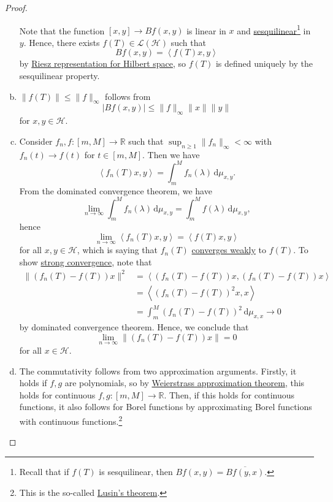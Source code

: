 \begin{proof}
\begin{enumerate}[(a)]
		      Note that the function \([x, y] \to Bf(x, y)\) is linear in \(x\) and \href{https://en.wikipedia.org/wiki/Sesquilinear_form}{sesquilinear}\footnote{Recall that if \(f(T)\) is sesquilinear, then \(Bf(x, y) = \overline{Bf(y, x)}\).} in \(y\). Hence, there exists \(f(T) \in \mathcal{L} (\mathcal{H} )\) such that
		      \[
			      Bf(x, y) = \left\langle f(T)x, y \right\rangle
		      \]
		      by \hyperref[thm:Riesz-representation]{Riesz representation for Hilbert space}, so \(f(T)\) is defined uniquely by the sesquilinear property.
		\item \(\lVert f(T) \rVert \leq \lVert f \rVert _\infty \) follows from
		      \[
			      \vert Bf(x, y) \vert  \leq \lVert f \rVert _\infty \lVert x \rVert \lVert y \rVert
		      \]
		      for \(x, y\in \mathcal{H} \).
		\item Consider \(f_n, f\colon [m, M] \to \mathbb{R} \) such that \(\sup _{n\geq 1} \lVert f_n \rVert _\infty < \infty \) with \(f_n(t) \to f(t)\) for \(t\in [m, M]\). Then we have
		      \[
			      \left\langle f_n (T)x, y \right\rangle = \int_{m}^{M} f_n(\lambda ) \,\mathrm{d}\mu _{x, y}.
		      \]
		      From the dominated convergence theorem, we have
		      \[
			      \lim_{n \to \infty} \int_{m}^{M} f_n(\lambda ) \,\mathrm{d}\mu _{x, y} = \int_{m}^{M} f(\lambda ) \,\mathrm{d}\mu _{x, y},
		      \]
		      hence
		      \[
			      \lim_{n \to \infty} \left\langle f_n(T)x, y \right\rangle = \left\langle f(T)x, y \right\rangle
		      \]
		      for all \(x, y\in \mathcal{H} \), which is saying that \(f_n(T)\) \hyperref[def:weakly-convergence]{converges weakly} to \(f(T)\). To show \hyperref[def:strongly-convergence]{strong convergence}, note that
		      \[
			      \begin{split}
				      \lVert (f_n(T) - f(T)) x \rVert ^2
				      &= \left\langle (f_n(T) - f(T)) x, (f_n(T) - f(T)) x \right\rangle \\
				      &= \left\langle (f_n(T) - f(T))^2 x, x \right\rangle \\
				      &= \int_{m}^{M} (f_n(T) - f(T))^2 \,\mathrm{d}\mu _{x, x}
				      \to 0
			      \end{split}
		      \]
		      by dominated convergence theorem. Hence, we conclude that
		      \[
			      \lim_{n \to \infty} \lVert (f_n(T) - f(T)) x \rVert = 0
		      \]
		      for all \(x\in \mathcal{H} \).
		\item The commutativity follows from two approximation arguments. Firstly, it holds if \(f, g\) are polynomials, so by \hyperref[thm:Weierstrass-approximation]{Weierstrass approximation theorem}, this holds for continuous \(f, g\colon [m, M] \to \mathbb{R} \). Then, if this holds for continuous functions, it also follows for Borel functions by approximating Borel functions with continuous functions.\footnote{This is the so-called \href{https://en.wikipedia.org/wiki/Lusin's_theorem}{Lusin's theorem}.}
	\end{enumerate}
\end{proof}

